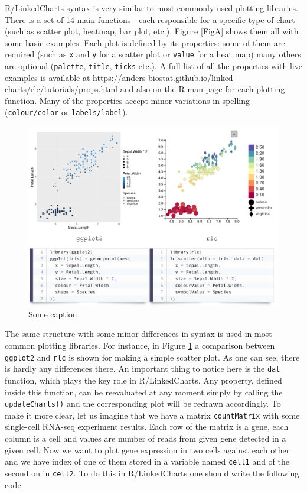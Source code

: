 \documentclass[twocolumn,10pt]{article}
\begin{document}
R/LinkedCharts syntax is very similar to most commonly used plotting libraries. There is a set of 14 main functions - each responsible for a specific type of chart (such as scatter plot, heatmap, bar plot, etc.). Figure \ref{FigA} shows them all with some basic examples. Each plot is defined by its properties: some of them are required (such as \texttt{x} and \texttt{y} for a scatter plot or \texttt{value} for a heat map) many others are optional (\texttt{palette}, \texttt{title}, \texttt{ticks} etc.). A full list of all the properties with live examples is available at \url{https://anders-biostat.github.io/linked-charts/rlc/tutorials/props.html} and also on the R man page for each plotting function. Many of the properties accept minor variations in spelling (\texttt{colour/color} or \texttt{labels/label}).

\begin{figure}
	\includegraphics[width=\textwidth]{FigB/figB.png}
	\caption{Some caption}
	\label{FigB}
\end{figure}

The same structure with some minor differences in syntax is used in most common plotting libraries. For instance, in Figure \ref{FigB} a comparison between \texttt{ggplot2} and \texttt{rlc} is shown for making a simple scatter plot. As one can see, there is hardly any differences there. An important thing to notice here is the \texttt{dat} function, which plays the key role in R/LinkedCharts. Any property, defined inside this function, can be reevaluated at any moment simply by calling the \texttt{updateCharts()} and the corresponding plot will be redrawn accordingly. To make it more clear, let us imagine that we have a matrix \texttt{countMatrix} with some single-cell RNA-seq experiment results. Each row of the matrix is a gene, each column is a cell and values are number of reads from given gene detected in a given cell. Now we want to plot gene expression in two cells against each other and we have index of one of them stored in a variable named \texttt{cell1} and of the second on in \texttt{cell2}. To do this in R/LinkedCharts one should write the following code:
\end{document}
